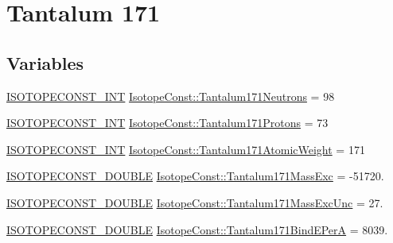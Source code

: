 \hypertarget{group___isotope_const-_tantalum-_ta171}{}\section{Tantalum 171}
\label{group___isotope_const-_tantalum-_ta171}
\subsection*{Variables}
\begin{DoxyCompactItemize}
\item 
\mbox{\hyperlink{group___isotope_const-_macros_ga5f18360b3e99483a35c32d789e62621c}{I\+S\+O\+T\+O\+P\+E\+C\+O\+N\+S\+T\+\_\+\+I\+NT}} \mbox{\hyperlink{group___isotope_const-_tantalum-_ta171_ga8c964977cb2afd6d2501e8fb4d66b619}{Isotope\+Const\+::\+Tantalum171\+Neutrons}} = 98
\item 
\mbox{\hyperlink{group___isotope_const-_macros_ga5f18360b3e99483a35c32d789e62621c}{I\+S\+O\+T\+O\+P\+E\+C\+O\+N\+S\+T\+\_\+\+I\+NT}} \mbox{\hyperlink{group___isotope_const-_tantalum-_ta171_gacc410ca46214a6af17f7c9264a5258b7}{Isotope\+Const\+::\+Tantalum171\+Protons}} = 73
\item 
\mbox{\hyperlink{group___isotope_const-_macros_ga5f18360b3e99483a35c32d789e62621c}{I\+S\+O\+T\+O\+P\+E\+C\+O\+N\+S\+T\+\_\+\+I\+NT}} \mbox{\hyperlink{group___isotope_const-_tantalum-_ta171_gab045ec9c9c0d429734f022dde3b4911c}{Isotope\+Const\+::\+Tantalum171\+Atomic\+Weight}} = 171
\item 
\mbox{\hyperlink{group___isotope_const-_macros_ga8f45a7272ce02c0b4c65c44636ed719a}{I\+S\+O\+T\+O\+P\+E\+C\+O\+N\+S\+T\+\_\+\+D\+O\+U\+B\+LE}} \mbox{\hyperlink{group___isotope_const-_tantalum-_ta171_ga054479e6d7ead7359b11d4e5a1f3b8c7}{Isotope\+Const\+::\+Tantalum171\+Mass\+Exc}} = -\/51720.
\item 
\mbox{\hyperlink{group___isotope_const-_macros_ga8f45a7272ce02c0b4c65c44636ed719a}{I\+S\+O\+T\+O\+P\+E\+C\+O\+N\+S\+T\+\_\+\+D\+O\+U\+B\+LE}} \mbox{\hyperlink{group___isotope_const-_tantalum-_ta171_gaef0f1f5741addba1b10c429e3093668d}{Isotope\+Const\+::\+Tantalum171\+Mass\+Exc\+Unc}} = 27.
\item 
\mbox{\hyperlink{group___isotope_const-_macros_ga8f45a7272ce02c0b4c65c44636ed719a}{I\+S\+O\+T\+O\+P\+E\+C\+O\+N\+S\+T\+\_\+\+D\+O\+U\+B\+LE}} \mbox{\hyperlink{group___isotope_const-_tantalum-_ta171_ga4aa52044f7d45c9c72d4e9f93e15c77e}{Isotope\+Const\+::\+Tantalum171\+Bind\+E\+PerA}} = 8039.
\item 

\end{DoxyCompactItemize}

